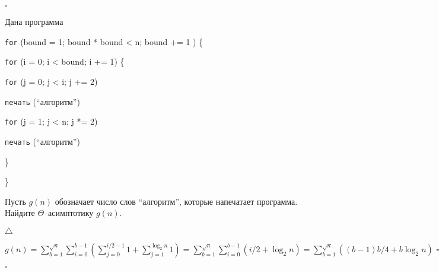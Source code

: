 \documentclass[12pt]{extreport}
\theoremstyle{definiton}
\theoremstyle{definition}
\theoremstyle{definition}
\newcounter{problem}
\newcounter{subproblem}
\def\beforPRskip{
	\bigskip
}
\def\pr{\beforPRskip\noindent\stepcounter{problem}{\bf \theproblem .\;}\setcounter{subproblem}{0}}
\begin{document}
       
       
       \hfill $\square$
       
\pr Дана программа

{\tt for} (bound = 1; bound * bound < n; bound += 1 ) \{

 \hspace{4mm} {\tt for} (i = 0; i < bound; i += 1) \{

 \hspace{8mm} {\tt for} (j = 0; j < i; j += 2)
 
 \hspace{12mm} {\tt печать} (``алгоритм'')

 \hspace{8mm} {\tt for} (j = 1; j < n; j *= 2)

 \hspace{12mm} {\tt печать} (``алгоритм'')
 
 \hspace{4mm} \}

\}

\smallskip

\noindent Пусть $g(n)$ обозначает число слов ``алгоритм'', которые напечатает программа. Найдите $\Theta$--асимптотику $g(n)$.

$\triangle$
	
	$g(n) = \sum\limits_{b=1}^{\sqrt{n}} \sum\limits_{i=0}^{b-1}(\sum\limits_{j=0}^{i/2 - 1}1 + \sum\limits_{j=1}^{\log_2n}1) = 
	\sum\limits_{b=1}^{\sqrt{n}} \sum\limits_{i=0}^{b-1}(i/2+\log_2n) = \sum\limits_{b=1}^{\sqrt{n}}((b-1)b/4+b\log_2n) = \Theta(n^{3/2}) + \Theta(n\log n) \Rightarrow g(n) = \Theta(n^{3/2})$
	
\hfill $\square$
\end{document}
